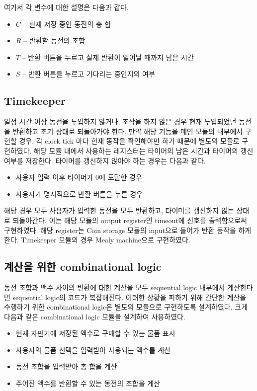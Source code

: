 \documentclass{scrartcl}
\begin{document}
여기서 각 변수에 대한 설명은 다음과 같다.

\begin{itemize}
  \item \(C\) -- 현재 저장 중인 동전의 총 합
  \item \(R\) -- 반환할 동전의 조합
  \item \(T\) -- 반환 버튼을 누르고 실제 반환이 일어날 때까지 남은 시간
  \item \(S\) -- 반환 버튼을 누르고 기다리는 중인지의 여부
\end{itemize}

\subsection{Timekeeper}
일정 시간 이상 동전을 투입하지 않거나, 조작을 하지 않은 경우 현재 투입되었던 동전을 반환하고 초기 상태로 되돌아가야 한다.
만약 해당 기능을 메인 모듈의 내부에서 구현할 경우, 각 clock tick 마다 현재 동작을 확인해야만 하기 때문에 별도의 모듈로
구현하였다.
해당 모듈 내에서 사용하는 레지스터는 타이머의 남은 시간과 타이머의 갱신 여부를 저장한다. 타이머를 갱신하지 않아야 하는 경우는
다음과 같다.

\begin{itemize}
  \item 사용자 입력 이후 타이머가 0에 도달한 경우
  \item 사용자가 명시적으로 반환 버튼을 누른 경우
\end{itemize}

해당 경우 모두 사용자가 입력한 동전을 모두 반환하고, 타이머를 갱신하지 않는 상태로 되돌아간다. 이는 해당 모듈의
output register인 timeout에 신호를 출력함으로써 구현하였다. 해당 register는 Coin storage 모듈의 input으로
들어가 반환 동작을 하게 한다.
Timekeeper 모듈의 경우 Mealy machine으로 구현하였다.

\subsection{계산을 위한 combinational logic}
동전 조합과 액수 사이의 변환에 대한 계산을 모두 sequential logic 내부에서 계산한다면 sequential logic의 코드가
복잡해진다. 이러한 상황을 피하기 위해 간단한 계산을 수행하기 위한 combinational logic은 별도의 모듈으로 구현하도록
설계하였다. 크게 다음과 같은 combinational logic 모듈을 설계하여 사용하였다.

\begin{itemize}
  \item 현재 자판기에 저장된 액수로 구매할 수 있는 물품 표시
  \item 사용자의 물품 선택을 입력받아 사용되는 액수를 계산
  \item 동전 조합을 입력받아 총 합을 계산
  \item 주어진 액수를 반환할 수 있는 동전의 조합을 계산
\end{itemize}
\end{document}
